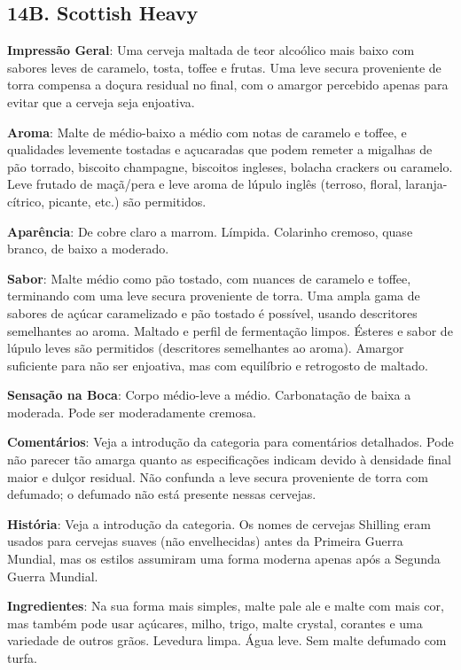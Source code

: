 \subsection*{14B. Scottish Heavy}
\textbf{Impressão Geral}: Uma cerveja maltada de teor alcoólico mais baixo com sabores leves de caramelo, tosta, toffee e frutas. Uma leve secura proveniente de torra compensa a doçura residual no final, com o amargor percebido apenas para evitar que a cerveja seja enjoativa.

\textbf{Aroma}: Malte de médio-baixo a médio com notas de caramelo e toffee, e qualidades levemente tostadas e açucaradas que podem remeter a migalhas de pão torrado, biscoito champagne, biscoitos ingleses, bolacha crackers ou caramelo. Leve frutado de maçã/pera e leve aroma de lúpulo inglês (terroso, floral, laranja-cítrico, picante, etc.) são permitidos.

\textbf{Aparência}: De cobre claro a marrom. Límpida. Colarinho cremoso, quase branco, de baixo a moderado.

\textbf{Sabor}: Malte médio como pão tostado, com nuances de caramelo e toffee, terminando com uma leve secura proveniente de torra. Uma ampla gama de sabores de açúcar caramelizado e pão tostado é possível, usando descritores semelhantes ao aroma. Maltado e perfil de fermentação limpos. Ésteres e sabor de lúpulo leves são permitidos (descritores semelhantes ao aroma). Amargor suficiente para não ser enjoativa, mas com equilíbrio e retrogosto de maltado.

\textbf{Sensação na Boca}: Corpo médio-leve a médio. Carbonatação de baixa a moderada. Pode ser moderadamente cremosa.

\textbf{Comentários}: Veja a introdução da categoria para comentários detalhados. Pode não parecer tão amarga quanto as especificações indicam devido à densidade final maior e dulçor residual. Não confunda  a leve secura proveniente de torra com defumado; o defumado não está presente nessas cervejas.

\textbf{História}: Veja a introdução da categoria. Os nomes de cervejas Shilling eram usados para cervejas suaves (não envelhecidas) antes da Primeira Guerra Mundial, mas os estilos assumiram uma forma moderna apenas após a Segunda Guerra Mundial.

\textbf{Ingredientes}: Na sua forma mais simples, malte pale ale e malte com mais cor, mas também pode usar açúcares, milho, trigo, malte crystal, corantes e uma variedade de outros grãos. Levedura limpa. Água leve. Sem malte defumado com turfa.

